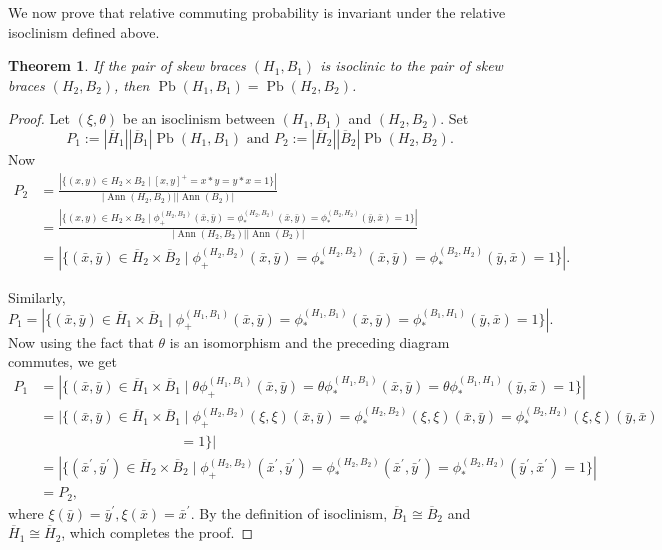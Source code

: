\documentclass[11pt, oneside]{amsart}
\numberwithin{equation}{section}
\theoremstyle{plain}
\newtheorem{thm}[equation]{Theorem}
\theoremstyle{definition}
\newcommand{\Pb}{\operatorname{Pb} }
\newcommand{\Ann}{\operatorname{Ann} }
\begin{document}
 We now prove that relative commuting probability is invariant under the relative  isoclinism defined above.
 \begin{thm}\label{relative isoclinism and commuting probability}
       If the pair of skew braces $(H_1,B_1)$ is isoclinic to the pair of skew braces $(H_2,B_2)$, then $\Pb(H_1,B_1) = \Pb(H_2,B_2)$.
 \end{thm}
 \begin{proof}
       Let $(\xi,\theta)$ be an isoclinism between $(H_1,B_1)$ and $(H_2,B_2)$. Set 
       $$P_1 := |\overline{H}_1||\overline{B}_1|\Pb(H_1,B_1) \mbox{ and } P_2:= |\overline{H}_2||\overline{B}_2|\Pb(H_2,B_2).$$ 
       Now
      \begin{align*}
        P_2  &=\frac{|\{(x,y)\in H_2\times B_2 \mid [x,y]^+=x\ast y=y\ast x=1\}|}{|\Ann(H_2,B_2)||\Ann(B_2)|}\\
            &=\frac{|\{(x,y)\in H_2\times B_2 \mid \phi_+^{(H_2,B_2)}(\bar{x},\bar{y})=\phi_\ast ^{(H_2,B_2)}(\bar{x},\bar{y})=\phi_\ast ^{(B_2,H_2)}(\bar{y},\bar{x})=1\}|}{|\Ann(H_2,B_2)||\Ann(B_2)|}\\
            &=|\{(\bar{x},\bar{y})\in \overline{H}_2 \times \overline{B}_2\mid \phi_+^{(H_2,B_2)}(\bar{x},\bar{y})=\phi_\ast ^{(H_2,B_2)}(\bar{x},\bar{y})=\phi_\ast ^{(B_2,H_2)}(\bar{y},\bar{x})=1\}|.
      \end{align*}

      Similarly,
      $$P_1=|\{(\bar{x},\bar{y})\in \overline{H}_1\times \overline{B}_1\mid \phi_+^{(H_1,B_1)}(\bar{x},\bar{y})=\phi_\ast ^{(H_1,B_1)}(\bar{x},\bar{y})=\phi_\ast ^{(B_1,H_1)}(\bar{y},\bar{x})=1\}|.$$
      Now using the fact that $\theta$ is an isomorphism and the preceding diagram commutes, we get
      \begin{align*}
            P_1  &=|\{(\bar{x},\bar{y})\in \overline{H}_1 \times \overline{B}_1 \mid \theta \phi_+^{(H_1,B_1)}(\bar{x},\bar{y})=\theta \phi_\ast ^{(H_1,B_1)}(\bar{x},\bar{y})=\theta \phi_\ast ^{(B_1,H_1)}(\bar{y},\bar{x})=1\}|\\
            &=|\{(\bar{x},\bar{y})\in \overline{H}_1\times \overline{B}_1\mid\phi_+^{(H_2,B_2)}(\xi,\xi)(\bar{x},\bar{y})=\phi_\ast ^{(H_2,B_2)}(\xi,\xi)(\bar{x},\bar{y})  =\phi_\ast ^{(B_2,H_2)}(\xi,\xi)(\bar{y},\bar{x})\\
            & \quad \quad \quad \quad \hspace{1in}=1\}|\\
            &=|\{(\bar{x}^\prime,\bar{y}^\prime)\in \overline{H}_2\times \overline{B}_2\mid \phi_+^{(H_2,B_2)}(\bar{x}^\prime,\bar{y}^\prime)=\phi_\ast ^{(H_2,B_2)}(\bar{x}^\prime,\bar{y}^\prime)=\phi_\ast ^{(B_2,H_2)}(\bar{y}^\prime,\bar{x}^\prime)=1\}|\\
            & = P_2,
  \end{align*}
 where $\xi (\bar{y})=\bar{y}^\prime,\xi (\bar{x})=\bar{x}^\prime$. 
By the definition of isoclinism, $\overline{B}_1\cong \overline{B}_2$ and $\overline{H}_1 \cong \overline{H}_2$, which completes the proof. 
 \end{proof}
\end{document}
